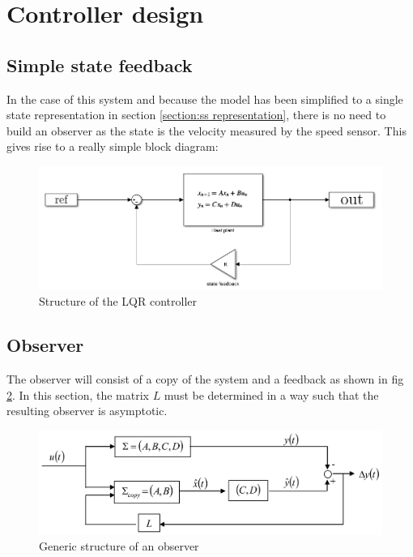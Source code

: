 \section{Controller design}

\subsection{Simple state feedback}

In the case of this system and because the model has been simplified to a single state representation in section
\ref{section:ss representation}, there is no need to build an observer as the state is the velocity measured by the 
speed sensor. This gives rise to a really simple block diagram:

\begin{figure}[H]
    \centering
    \includegraphics[width = \textwidth]{Pictures/lqr_controller.png}
    \caption{Structure of the LQR controller}
    \label{fig:lqr structure}
\end{figure}


\iffalse
\subsection{Observer}

The observer will consist of a copy of the system and a feedback as shown in fig \ref{fig:observer structure}. In this
section, the matrix $L$ must be determined in a way such that the resulting observer is asymptotic.

\begin{figure}[H]
    \centering
    \includegraphics[height=\textheight/7]{Pictures/observer_general_structure.png}
    \caption{Generic structure of an observer}
    \label{fig:observer structure}
\end{figure}

